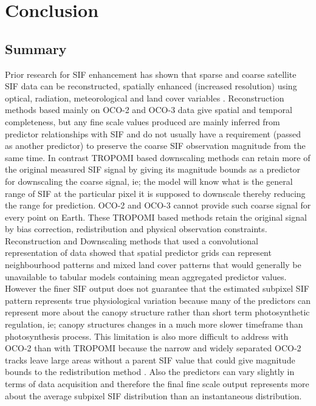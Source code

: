 \chapter{Conclusion\label{cha:chapter7}}


\section{Summary\label{sec:summary}}

Prior research for SIF enhancement has shown that sparse and coarse satellite SIF data can be reconstructed, spatially enhanced (increased resolution) using optical, radiation, meteorological and land cover variables \cite{li2019global,zhang2018global,shen2022spatiotemporal}. Reconstruction methods based mainly on OCO-2 and OCO-3 data give spatial and temporal completeness, but any fine scale values produced are mainly inferred from predictor relationships with SIF and do not usually have a requirement (passed as another predictor) to preserve the coarse SIF observation magnitude from the same time. In contrast TROPOMI based downscaling methods \cite{hu2024spatially,chen2025improved,zhang2023generating} can retain more of the original measured SIF signal by giving its magnitude bounds as a predictor for downscaling the coarse signal, ie; the model will know what is the general range of SIF at the particular pixel it is supposed to downscale thereby reducing the range for prediction. OCO-2 and OCO-3 cannot provide such coarse signal for every point on Earth. These TROPOMI based methods retain the original signal by bias correction, redistribution and physical observation constraints. Reconstruction and Downscaling methods that used a convolutional representation of data showed that spatial predictor grids can represent neighbourhood patterns and mixed land cover patterns that would generally be unavailable to tabular models containing mean aggregated predictor values\cite{gensheimer2022convolutional,du2025cnsif}. However the finer SIF output does not guarantee that the estimated subpixel SIF pattern represents true physiological variation because many of the predictors can represent more about the canopy structure rather than short term photosynthetic regulation, ie; canopy structures changes in a much more slower timeframe than photosynthesis process. This limitation is also more difficult to address with OCO-2 than with TROPOMI because the narrow and widely separated OCO-2 tracks leave large areas without a parent SIF value that could give magnitude bounds to the redistribution method \cite{yu2019high}. Also the predictors can vary slightly in terms of data acquisition and therefore the final fine scale output represents more about the average subpixel SIF distribution than an instantaneous distribution.

